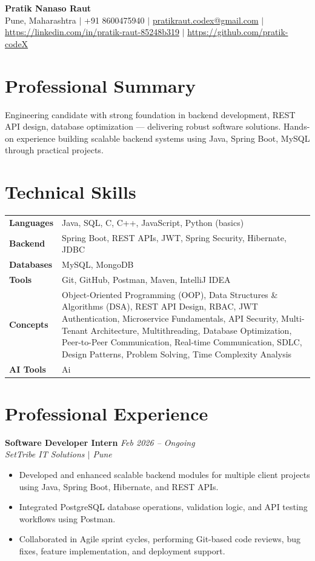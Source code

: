 \documentclass[10.5pt,a4paper]{article}
\begin{document}
\begin{center}
{\Large\bfseries Pratik Nanaso Raut}\\[2pt]
Pune, Maharashtra $|$ +91 8600475940 $|$ \href{mailto:pratikraut.codex@gmail.com}{pratikraut.codex@gmail.com} $|$ \href{https://linkedin.com/in/pratik-raut-85248b319}{https://linkedin.com/in/pratik-raut-85248b319} $|$ \href{https://github.com/pratik-codeX}{https://github.com/pratik-codeX}
\end{center}
\vspace{-2pt}
\section{Professional Summary}
Engineering candidate with strong foundation in backend development, REST API design, database optimization — delivering robust software solutions. Hands-on experience building scalable backend systems using Java, Spring Boot, MySQL through practical projects.
\section{Technical Skills}
\begin{tabular}{@{}p{}p{}@{}}
\textbf{Languages} & Java, SQL, C, C++, JavaScript, Python (basics) \\[1pt]
\textbf{Backend} & Spring Boot, REST APIs, JWT, Spring Security, Hibernate, JDBC \\[1pt]
\textbf{Databases} & MySQL, MongoDB \\[1pt]
\textbf{Tools} & Git, GitHub, Postman, Maven, IntelliJ IDEA \\[1pt]
\textbf{Concepts} & Object-Oriented Programming (OOP), Data Structures \& Algorithms (DSA), REST API Design, RBAC, JWT Authentication, Microservice Fundamentals, API Security, Multi-Tenant Architecture, Multithreading, Database Optimization, Peer-to-Peer Communication, Real-time Communication, SDLC, Design Patterns, Problem Solving, Time Complexity Analysis \\[1pt]
\textbf{AI Tools} & Ai \\
\end{tabular}
\section{Professional Experience}
\textbf{Software Developer Intern} \hfill \textit{Feb 2026 -- Ongoing}
\\\textit{SetTribe IT Solutions $|$ Pune}
\begin{itemize}
  \item Developed and enhanced scalable backend modules for multiple client projects using Java, Spring Boot, Hibernate, and REST APIs.
  \item Integrated PostgreSQL database operations, validation logic, and API testing workflows using Postman.
  \item Collaborated in Agile sprint cycles, performing Git-based code reviews, bug fixes, feature implementation, and deployment support.
\end{itemize}
\end{document}
